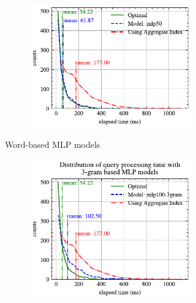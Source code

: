 \documentclass[conference]{IEEEtran}
\begin{document}
\begin{figure}[!th]
\begin{subfigure}{0.45\textwidth}
\begin{subfigure}{\textwidth}
			\includegraphics[]{graphics/perf_dist_mlp50_B.pdf}
		\end{subfigure}
		\caption{Word-based MLP models}
	\end{subfigure}
	\hfill
	\begin{subfigure}{0.45\textwidth}
		\begin{subfigure}{\textwidth}
			\centering
			\includegraphics[]{graphics/perf_dist_mlp100_3gram_B.pdf}
		\end{subfigure}
		\vfill
		\begin{subfigure}{\textwidth}
			\centering

\end{subfigure}
\end{subfigure}
\end{figure}
\end{document}
